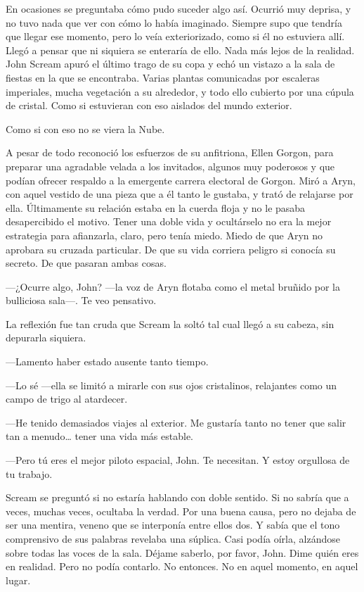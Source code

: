 \noindent{}En ocasiones se preguntaba cómo pudo suceder algo así. Ocurrió muy deprisa, y no tuvo nada que ver con cómo lo había imaginado. Siempre supo que tendría que llegar ese momento, pero lo veía exteriorizado, como si él no estuviera allí. Llegó a pensar que ni siquiera se enteraría de ello. Nada más lejos de la realidad.\\

\noindent{}John Scream apuró el último trago de su copa y echó un vistazo a la sala de fiestas en la que se encontraba. Varias plantas comunicadas por escaleras imperiales, mucha vegetación a su alrededor, y todo ello cubierto por una cúpula de cristal. Como si estuvieran con eso aislados del mundo exterior.

Como si con eso no se viera la Nube.

A pesar de todo reconoció los esfuerzos de su anfitriona, Ellen Gorgon, para preparar una agradable velada a los invitados, algunos muy poderosos y que podían ofrecer respaldo a la emergente carrera electoral de Gorgon. Miró a Aryn, con aquel vestido de una pieza que a él tanto le gustaba, y trató de relajarse por ella. Últimamente su relación estaba en la cuerda floja y no le pasaba desapercibido el motivo. Tener una doble vida y ocultárselo no era la mejor estrategia para afianzarla, claro, pero tenía miedo. Miedo de que Aryn no aprobara su cruzada particular. De que su vida corriera peligro si conocía su secreto. De que pasaran ambas cosas.

---¿Ocurre algo, John? ---la voz de Aryn flotaba como el metal bruñido por la bulliciosa sala---. Te veo pensativo.

La reflexión fue tan cruda que Scream la soltó tal cual llegó a su cabeza, sin depurarla siquiera.

---Lamento haber estado ausente tanto tiempo.

---Lo sé ---ella se limitó a mirarle con sus ojos cristalinos, relajantes como un campo de trigo al atardecer.

---He tenido demasiados viajes al exterior. Me gustaría tanto no tener que salir tan a menudo\dots{} tener una vida más estable.

---Pero tú eres el mejor piloto espacial, John. Te necesitan. Y estoy orgullosa de tu trabajo.

Scream se preguntó si no estaría hablando con doble sentido. Si no sabría que a veces, muchas veces, ocultaba la verdad. Por una buena causa, pero no dejaba de ser una mentira, veneno que se interponía entre ellos dos. Y sabía que el tono comprensivo de sus palabras revelaba una súplica. Casi podía oírla, alzándose sobre todas las voces de la sala. Déjame saberlo, por favor, John. Dime quién eres en realidad. Pero no podía contarlo. No entonces. No en aquel momento, en aquel lugar.

